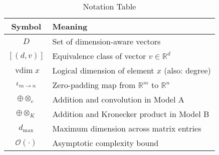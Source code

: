 \documentclass[11pt]{article}
\newcommand{\vdim}{\operatorname{vdim}}
\begin{document}
\vspace{1em}

\begin{table}[h]
\centering
\caption{Notation Table}
\begin{tabular}{cl}
\toprule
\textbf{Symbol} & \textbf{Meaning} \\
\midrule
$D$ & Set of dimension-aware vectors \\
$[(d,v)]$ & Equivalence class of vector $v \in \mathbb{R}^d$ \\
$\vdim x$ & Logical dimension of element $x$ (also: degree) \\
$\iota_{m \to n}$ & Zero-padding map from $\mathbb{R}^m$ to $\mathbb{R}^n$ \\
$\oplus \otimes_c$ & Addition and convolution in Model A \\
$\oplus \otimes_K$ & Addition and Kronecker product in Model B \\
$d_{\max}$ & Maximum dimension across matrix entries \\
$\mathcal{O}(\cdot)$ & Asymptotic complexity bound \\
\bottomrule
\end{tabular}
\end{table}
\end{document}
